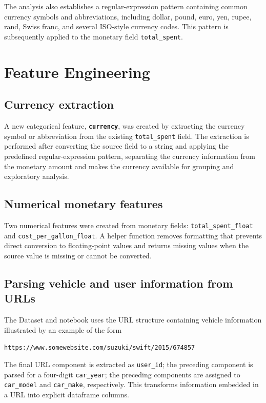 \documentclass[12pt,a4paper]{article}
\begin{document}
The analysis also establishes a regular-expression pattern containing common currency symbols and abbreviations, including dollar, pound, euro, yen, rupee, rand, Swiss franc, and several ISO-style currency codes. This pattern is subsequently applied to the monetary field \texttt{total\_spent}. \cite{notebook}

\section{Feature Engineering} 

\subsection{Currency extraction}

A new categorical feature, \texttt{\textbf{currency}}, was created by extracting the currency symbol or abbreviation from the existing \texttt{total\_spent} field. The extraction is performed after converting the source field to a string and applying the predefined regular-expression pattern, separating the currency information from the monetary amount and makes the currency available for grouping and exploratory analysis. \cite{notebook}

\subsection{Numerical monetary features}

Two numerical features were created from monetary fields: \texttt{total\_spent\_float} and \texttt{cost\_per\_gallon\_float}. A helper function removes formatting that prevents direct conversion to floating-point values and returns missing values when the source value is missing or cannot be converted.\cite{notebook}

\subsection{Parsing vehicle and user information from URLs}

The Dataset and notebook uses the URL structure containing vehicle information illustrated by an example of the form

\begin{center}
\texttt{https://www.somewebsite.com/suzuki/swift/2015/674857}
\end{center}

The final URL component is extracted as \texttt{user\_id}; the preceding component is parsed for a four-digit \texttt{car\_year}; the preceding components are assigned to \texttt{car\_model} and \texttt{car\_make}, respectively. This transforms information embedded in a URL into explicit dataframe columns. \cite{notebook}
\end{document}
